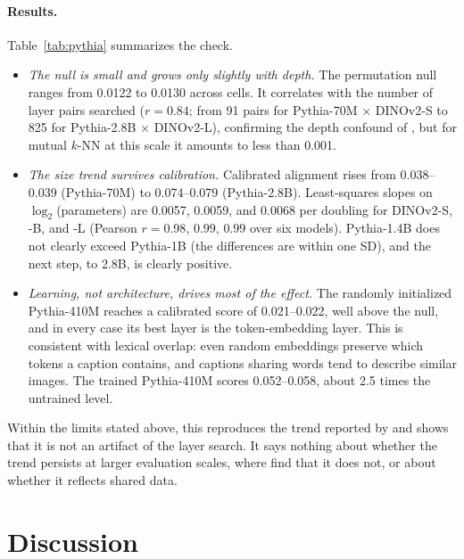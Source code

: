 \documentclass[11pt]{article}
\begin{document}
\paragraph{Results.} Table~\ref{tab:pythia} summarizes the check.
\begin{itemize}
  \item \emph{The null is small and grows only slightly with depth.} The permutation null ranges from 0.0122 to 0.0130 across cells. It correlates with the number of layer pairs searched ($r=0.84$; from 91 pairs for Pythia-70M $\times$ DINOv2-S to 825 for Pythia-2.8B $\times$ DINOv2-L), confirming the depth confound of \citet{groger2026aristotelian}, but for mutual $k$-NN at this scale it amounts to less than 0.001.
  \item \emph{The size trend survives calibration.} Calibrated alignment rises from 0.038--0.039 (Pythia-70M) to 0.074--0.079 (Pythia-2.8B). Least-squares slopes on $\log_2$(parameters) are 0.0057, 0.0059, and 0.0068 per doubling for DINOv2-S, -B, and -L (Pearson $r=0.98$, $0.99$, $0.99$ over six models). Pythia-1.4B does not clearly exceed Pythia-1B (the differences are within one SD), and the next step, to 2.8B, is clearly positive.
  \item \emph{Learning, not architecture, drives most of the effect.} The randomly initialized Pythia-410M reaches a calibrated score of 0.021--0.022, well above the null, and in every case its best layer is the token-embedding layer. This is consistent with lexical overlap: even random embeddings preserve which tokens a caption contains, and captions sharing words tend to describe similar images. The trained Pythia-410M scores 0.052--0.058, about 2.5 times the untrained level.
\end{itemize}
Within the limits stated above, this reproduces the trend reported by \citet{huh2024platonic} and shows that it is not an artifact of the layer search. It says nothing about whether the trend persists at larger evaluation scales, where \citet{koepke2026cave} find that it does not, or about whether it reflects shared data.


\section{Discussion}
\label{sec:disc}
\end{document}
